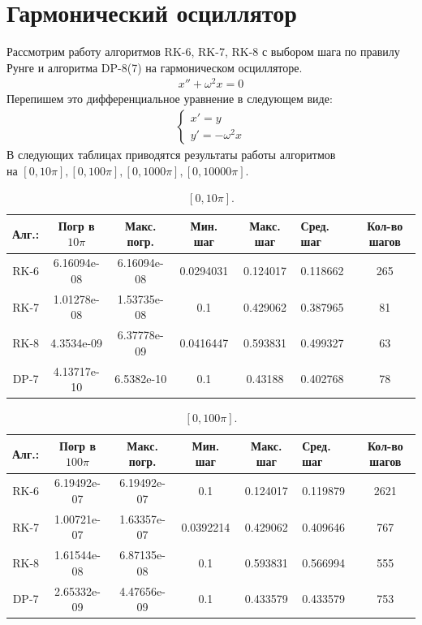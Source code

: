 \documentclass[12pt, a4paper] {article}
\theoremstyle{remark}
\theoremstyle{definition}
\begin{document}
\section{Гармонический осциллятор}
Рассмотрим работу алгоритмов RK-6, RK-7, RK-8 с выбором шага по правилу Рунге и алгоритма DP-8(7) на гармоническом осцилляторе.\\
\begin{gather}
	x'' + \omega^2x = 0
\end{gather}
Перепишем это дифференциальное уравнение в следующем виде:
\begin{gather}
\begin{cases}
	x' = y\\
	y' = -\omega^2x
\end{cases}
\end{gather}
В следующих таблицах приводятся результаты работы алгоритмов \\на $[0, 10\pi], [0, 100\pi], [0, 1000\pi], [0, 10000\pi]$.
\begin{table}
\caption{\label{tab:canonsummary}$[0, 10\pi]$.}
\begin{center}
\begin{tabular}{|c|c|c|c|c|с|c|}
\hline
Алг.: & Погр в $10\pi$ & Макс. погр. & Мин. шаг & Макс. шаг & Сред. шаг & Кол-во шагов \\
\hline
RK-6 & 6.16094e-08 & 6.16094e-08 & 0.0294031 & 0.124017 & 0.118662 &  265 \\
\hline
RK-7 & 1.01278e-08 & 1.53735e-08 &  0.1 & 0.429062 & 0.387965 & 81 \\
\hline
RK-8 & 4.3534e-09 & 6.37778e-09 & 0.0416447 & 0.593831 & 0.499327 & 63\\
\hline
DP-7 & 4.13717e-10 & 6.5382e-10 & 0.1 & 0.43188 & 0.402768 & 78 \\
\hline
\end{tabular}
\end{center}
\end{table} 

\begin{table}
\caption{\label{tab:canonsummary}$[0, 100\pi]$.}
\begin{center}
\begin{tabular}{|c|c|c|c|c|с|c|}
\hline
Алг.: & Погр в $100\pi$ & Макс. погр. & Мин. шаг & Макс. шаг & Сред. шаг & Кол-во шагов \\
\hline
RK-6 &  6.19492e-07 &  6.19492e-07  & 0.1 & 0.124017 & 0.119879 &  2621 \\
\hline
RK-7 & 1.00721e-07 & 1.63357e-07 &  0.0392214 & 0.429062 & 0.409646 & 767 \\
\hline
RK-8 & 1.61544e-08 & 6.87135e-08 & 0.1 & 0.593831 & 0.566994 & 555\\
\hline
DP-7 & 2.65332e-09 & 4.47656e-09 & 0.1 & 0.433579 & 0.433579 & 753 \\
\hline
\end{tabular}
\end{center}
\end{table} 
\end{document}
